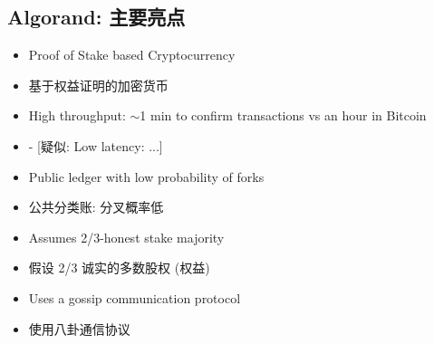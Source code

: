 \subsection{Algorand: 主要亮点}

\begin{itemize}
    \item Proof of Stake based Cryptocurrency
    \item 基于权益证明的加密货币
    \item High throughput: $\sim$1 min to confirm transactions vs an hour in Bitcoin
    \item - [疑似: Low latency: ...]
    \item Public ledger with low probability of forks
    \item 公共分类账: 分叉概率低
    \item Assumes 2/3-honest stake majority
    \item 假设 2/3 诚实的多数股权 (权益)
    \item Uses a gossip communication protocol
    \item 使用八卦通信协议
\end{itemize}
